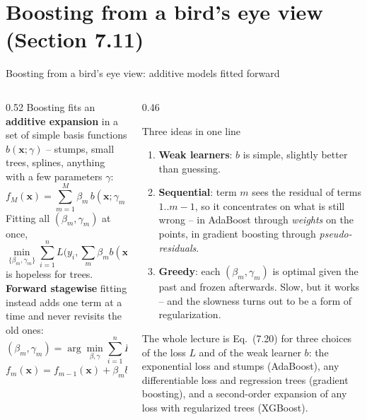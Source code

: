 \documentclass[10pt,aspectratio=169]{beamer}
\begin{document}
\section{Boosting from a bird's eye view (Section 7.11)}

\begin{frame}{Boosting from a bird's eye view: additive models fitted forward}
\begin{columns}[T]
\begin{column}{0.52\textwidth}
\footnotesize
Boosting fits an \textbf{additive expansion} in a set of simple basis
functions $b(\bm{x};\gamma)$ -- stumps, small trees, splines, anything with a
few parameters $\gamma$:
\[
f_M(\bm{x})=\sum_{m=1}^M\beta_m\,b(\bm{x};\gamma_m).\tag{7.19}
\]
Fitting all $(\beta_m,\gamma_m)$ at once,
\[
\min_{\{\beta_m,\gamma_m\}}\sum_{i=1}^n L\Big(y_i,\sum_m\beta_m b(\bm{x}_i;\gamma_m)\Big),
\]
is hopeless for trees.  \textbf{Forward stagewise} fitting instead adds one
term at a time and never revisits the old ones:
\[
(\beta_m,\gamma_m)=\arg\min_{\beta,\gamma}\sum_{i=1}^n
L\big(y_i,\,f_{m-1}(\bm{x}_i)+\beta\, b(\bm{x}_i;\gamma)\big),\tag{7.20}
\]
\[
f_m(\bm{x})=f_{m-1}(\bm{x})+\beta_m b(\bm{x};\gamma_m),\qquad f_0=0 .
\]
\end{column}
\begin{column}{0.46\textwidth}
\begin{block}{Three ideas in one line}
\footnotesize
\begin{enumerate}
  \item \textbf{Weak learners}: $b$ is simple, slightly better than guessing.
  \item \textbf{Sequential}: term $m$ sees the residual of terms $1..m-1$,
    so it concentrates on what is still wrong -- in AdaBoost through
    \emph{weights} on the points, in gradient boosting through
    \emph{pseudo-residuals}.
  \item \textbf{Greedy}: each $(\beta_m,\gamma_m)$ is optimal given the past
    and frozen afterwards.  Slow, but it works -- and the slowness turns out
    to be a form of regularization.
\end{enumerate}
\end{block}
\footnotesize
The whole lecture is Eq.\ (7.20) for three choices of the loss $L$ and of the
weak learner $b$: the exponential loss and stumps (AdaBoost), any
differentiable loss and regression trees (gradient boosting), and a
second-order expansion of any loss with regularized trees (XGBoost).
\end{column}
\end{columns}
\end{frame}
\end{document}
